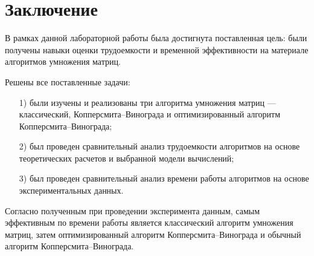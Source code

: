 {\center\chapter*{Заключение}}

В рамках данной лабораторной работы была достигнута поставленная цель: были получены навыки оценки трудоемкости и временной эффективности на материале алгоритмов умножения матриц.

Решены все поставленные задачи:

\begin{enumerate}
\item[1)]
были изучены и реализованы три алгоритма умножения матриц --- классический, Копперсмита--Винограда и оптимизированный алгоритм Копперсмита--Винограда;
\item[2)]
был проведен сравнительный анализ трудоемкости алгоритмов на основе теоретических расчетов и выбранной модели вычислений;
\item[3)]
был проведен сравнительный анализ времени работы алгоритмов на основе экспериментальных данных.
\end{enumerate}

Согласно полученным при проведении эксперимента данным, самым эффективным по времени работы является классический алгоритм умножения матриц, затем оптимизированный алгоритм Копперсмита--Винограда и обычный алгоритм Копперсмита--Винограда.
